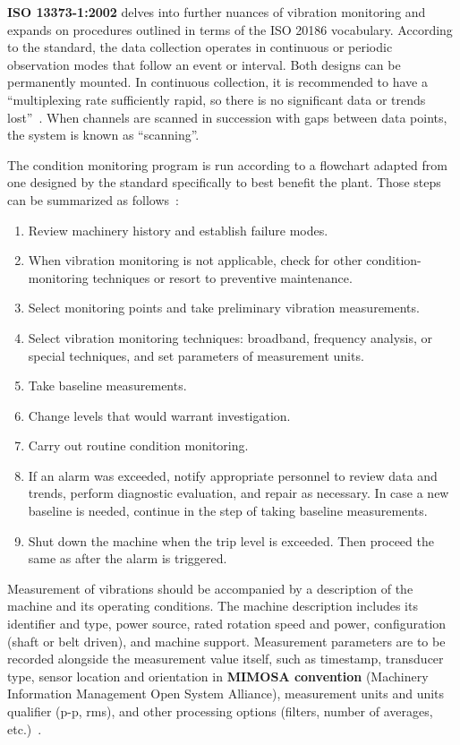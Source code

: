 \textbf{ISO 13373-1:2002} delves into further nuances of vibration monitoring and expands on procedures outlined in terms of the ISO 20186 vocabulary. According to the standard, the data collection operates in continuous or periodic observation modes that follow an event or interval. Both designs can be permanently mounted. In continuous collection, it is recommended to have a ``multiplexing rate sufficiently rapid, so there is no significant data or trends lost''~\cite{noauthor_iso_2002}. When channels are scanned in succession with gaps between data points, the system is known as ``scanning''.

The condition monitoring program is run according to a flowchart adapted from one designed by the standard specifically to best benefit the plant. Those steps can be summarized as follows~\cite{noauthor_iso_2002}:

\begin{enumerate}
\itemsep0pt
\item Review machinery history and establish failure modes.
\item When vibration monitoring is not applicable, check for other condition-monitoring techniques or resort to preventive maintenance.
\item Select monitoring points and take preliminary vibration measurements.
\item Select vibration monitoring techniques: broadband, frequency analysis, or special techniques, and set parameters of measurement units.
\item Take baseline measurements.
\item Change levels that would warrant investigation.
\item Carry out routine condition monitoring.
\item If an alarm was exceeded, notify appropriate personnel to review data and trends, perform diagnostic evaluation, and repair as necessary. In case a new baseline is needed, continue in the step of taking baseline measurements.
\item Shut down the machine when the trip level is exceeded. Then proceed the same as after the alarm is triggered.
\end{enumerate}

Measurement of vibrations should be accompanied by a description of the machine and its operating conditions. The machine description includes its identifier and type, power source, rated rotation speed and power, configuration (shaft or belt driven), and machine support. Measurement parameters are to be recorded alongside the measurement value itself, such as timestamp, transducer type, sensor location and orientation in \textbf{MIMOSA convention} (Machinery Information Management Open System Alliance), measurement units and units qualifier (p-p, rms), and other processing options (filters, number of averages, etc.)~\cite{noauthor_iso_2002}.

